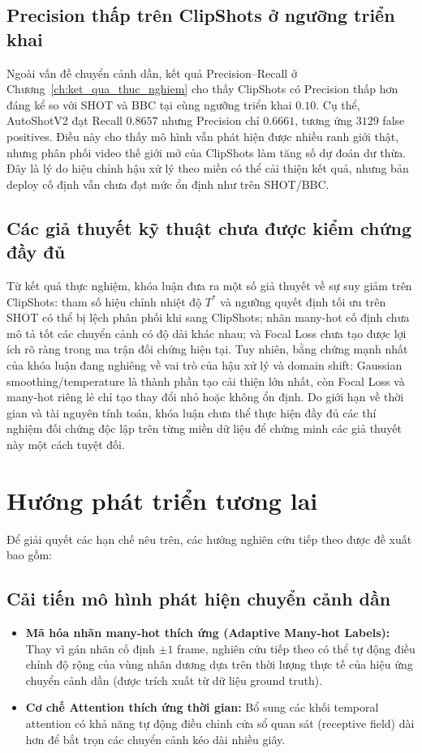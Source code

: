 \subsection{Precision thấp trên ClipShots ở ngưỡng triển khai}
Ngoài vấn đề chuyển cảnh dần, kết quả Precision--Recall ở Chương~\ref{ch:ket_qua_thuc_nghiem} cho thấy ClipShots có Precision thấp hơn đáng kể so với SHOT và BBC tại cùng ngưỡng triển khai $0.10$. Cụ thể, AutoShotV2 đạt Recall $0.8657$ nhưng Precision chỉ $0.6661$, tương ứng $3129$ false positives. Điều này cho thấy mô hình vẫn phát hiện được nhiều ranh giới thật, nhưng phân phối video thế giới mở của ClipShots làm tăng số dự đoán dư thừa. Đây là lý do hiệu chỉnh hậu xử lý theo miền có thể cải thiện kết quả, nhưng bản deploy cố định vẫn chưa đạt mức ổn định như trên SHOT/BBC.

\subsection{Các giả thuyết kỹ thuật chưa được kiểm chứng đầy đủ}
Từ kết quả thực nghiệm, khóa luận đưa ra một số giả thuyết về sự suy giảm trên ClipShots: tham số hiệu chỉnh nhiệt độ $T^*$ và ngưỡng quyết định tối ưu trên SHOT có thể bị lệch phân phối khi sang ClipShots; nhãn many-hot cố định chưa mô tả tốt các chuyển cảnh có độ dài khác nhau; và Focal Loss chưa tạo được lợi ích rõ ràng trong ma trận đối chứng hiện tại. Tuy nhiên, bằng chứng mạnh nhất của khóa luận đang nghiêng về vai trò của hậu xử lý và domain shift: Gaussian smoothing/temperature là thành phần tạo cải thiện lớn nhất, còn Focal Loss và many-hot riêng lẻ chỉ tạo thay đổi nhỏ hoặc không ổn định. Do giới hạn về thời gian và tài nguyên tính toán, khóa luận chưa thể thực hiện đầy đủ các thí nghiệm đối chứng độc lập trên từng miền dữ liệu để chứng minh các giả thuyết này một cách tuyệt đối.

\section{Hướng phát triển tương lai}
\label{sec:future_work}

Để giải quyết các hạn chế nêu trên, các hướng nghiên cứu tiếp theo được đề xuất bao gồm:

\subsection{Cải tiến mô hình phát hiện chuyển cảnh dần}
\begin{itemize}
    \item \textbf{Mã hóa nhãn many-hot thích ứng (Adaptive Many-hot Labels):} Thay vì gán nhãn cố định $\pm 1$ frame, nghiên cứu tiếp theo có thể tự động điều chỉnh độ rộng của vùng nhãn dương dựa trên thời lượng thực tế của hiệu ứng chuyển cảnh dần (được trích xuất từ dữ liệu ground truth).
    \item \textbf{Cơ chế Attention thích ứng thời gian:} Bổ sung các khối temporal attention có khả năng tự động điều chỉnh cửa sổ quan sát (receptive field) dài hơn để bắt trọn các chuyển cảnh kéo dài nhiều giây.
\end{itemize}

